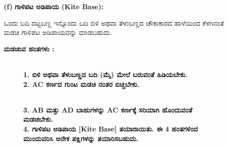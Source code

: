 \begin{enumerate}

\item[{\bf (f)}] \textbf{ಗಾಳಿಪಟ ಅಡಿಪಾಯ (Kite Base):}

ಒಂದು ಬದಿ ದಟ್ಟಬಣ್ಣ ಇನ್ನೊಂದು ಬದಿ ಬಿಳಿ ಅಥವಾ ತೆಳುಬಣ್ಣದ ಚೌಕಾಕಾರದ ಹಾಳೆಯಿಂದ ಕೆಳಗಿನಂತೆ ಮಡಚಿ ಗಾಳಿಪಟ ಅಡಿಪಾಯವನ್ನು ಮಾಡಬಹುದು. 

\noindent
\textbf{ಮಡಚುವ ಹಂತಗಳು :}
\begin{figure}[H]
\\
\textbf{1. ಬಿಳಿ ಅಥವಾ ತೆಳುಬಣ್ಣದ ಬದಿ (ಮೈ) ಮೇಲೆ ಬರುವಂತೆ ಹಿಡಿಯಬೇಕು.}\\
\textbf{2. AC ಕರ್ಣದ ಗುಂಟ ಮಡಚಿ ನಂತರ ಬಿಚ್ಚಬೇಕು.}
\end{figure}
\begin{figure}[H]
\\
\textbf{3. AB ಮತ್ತು AD ಬಾಹುಗಳನ್ನು  AC ಕರ್ಣಕ್ಕೆ ಸರಿಯಾಗಿ ಹೊಂದುವಂತೆ ಮಡಚಬೇಕು.}\\
\textbf{4. ಗಾಳಿಪಟ ಅಡಿಪಾಯ [Kite Base] ತಯಾರಾಯಿತು. ಈ 4 ಹಂತಗಳಿಂದ ಮುಂದುವರಿಸಿ ಅನೇಕ ಪಕ್ಷಿಗಳನ್ನು ತಯಾರಿಸಬಹುದು.}
\end{figure}
\end{enumerate}

